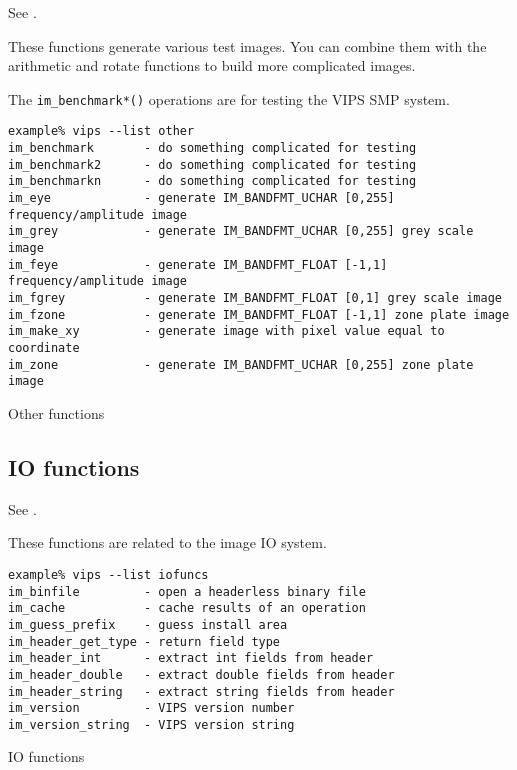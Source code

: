 See .

These functions generate various test images. You can combine them with
the arithmetic and rotate functions to build more complicated images.

The \verb+im_benchmark*()+ operations are for testing the VIPS SMP system.

\begin{fig2}
\begin{verbatim}
example% vips --list other
im_benchmark       - do something complicated for testing
im_benchmark2      - do something complicated for testing
im_benchmarkn      - do something complicated for testing
im_eye             - generate IM_BANDFMT_UCHAR [0,255] frequency/amplitude image
im_grey            - generate IM_BANDFMT_UCHAR [0,255] grey scale image
im_feye            - generate IM_BANDFMT_FLOAT [-1,1] frequency/amplitude image
im_fgrey           - generate IM_BANDFMT_FLOAT [0,1] grey scale image
im_fzone           - generate IM_BANDFMT_FLOAT [-1,1] zone plate image
im_make_xy         - generate image with pixel value equal to coordinate
im_zone            - generate IM_BANDFMT_UCHAR [0,255] zone plate image
\end{verbatim}
\caption{Other functions}
\label{fg:other}
\end{fig2}

\subsection{IO functions}

See .

These functions are related to the image IO system. 

\begin{fig2}
\begin{verbatim}
example% vips --list iofuncs
im_binfile         - open a headerless binary file
im_cache           - cache results of an operation
im_guess_prefix    - guess install area
im_header_get_type - return field type
im_header_int      - extract int fields from header
im_header_double   - extract double fields from header
im_header_string   - extract string fields from header
im_version         - VIPS version number
im_version_string  - VIPS version string
\end{verbatim}
\caption{IO functions}
\label{fg:io}
\end{fig2}
